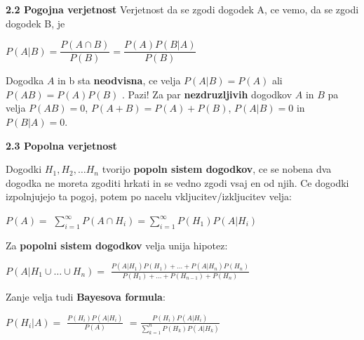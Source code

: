 \documentclass{article}
\begin{document}
\begin{multicols}{2}
	\textbf{2.2 Pogojna verjetnost}
	Verjetnost da se zgodi dogodek A, ce vemo, da se zgodi dogodek B, je
	\begin{center}
		\begin{math}
			P(A | B) = \dfrac{P(A \cap B)}{P(B)} = \dfrac{P(A)P(B|A)}{P(B)}
		\end{math}
	\end{center}
	Dogodka $A$ in b sta \textbf{neodvisna}, ce velja $P(A | B) = P(A)$ ali
	$P(A B) = P(A)P(B)$ .
	Pazi! Za par \textbf{nezdruzljivih} dogodkov $A$ in $B$
	pa velja $P(AB) = 0$,  $P(A + B) = P(A) + P(B)$, $P(A|B) = 0$ in $P(B|A) = 0$.

	\textbf{2.3 Popolna verjetnost}

	Dogodki $H_{1}, H_{2}, \dots H_{n}$ tvorijo \textbf{popoln sistem dogodkov},
	ce se nobena dva dogodka ne moreta zgoditi hrkati in se vedno
	zgodi vsaj en od njih. Ce dogodki izpolnjujejo ta pogoj, potem po
	nacelu vkljucitev/izkljucitev velja:
	\begin{center}
		\begin{math}
			P(A) =
		\end{math}
		\smallskip
		\begin{math}
			\sum_{i=1}^{\infty} P(A \cap H_{i}) =
			\sum_{i=1}^{\infty} P(H_{1}) P(A | H_{i})
		\end{math}
	\end{center}
	Za \textbf{popolni sistem dogodkov} velja unija hipotez:
	\begin{center}
		\begin{math}
			P(A|H_{1} \cup \dots \cup H_{n}) =
		\end{math}
		\bigskip
		\begin{math}
			\frac{
				P(A | H_{1}) P(H_{1}) + \dots +
				P(A | H_{n}) P(H_{n})
			}
			{
				P(H_{1}) + \dots + P(H_{n - 1}) + P(H_{n})
			}
		\end{math}
	\end{center}
	Zanje velja tudi \textbf{Bayesova formula}:
	\begin{center}
		\begin{math}
			P(H_{i} | A) =
		\end{math}
		\begin{math}
			\frac{
				P(H_{i}) P(A | H_{i})
			}
			{
				P(A)
			}
		\end{math}
		\begin{math}
			= \frac{
				P(H_{i}) P(A | H_{i})
			}
			{
				\sum_{k=1}^{n} P(H_{k}) P(A | H_{k})
			}
		\end{math}
	\end{center}


\end{multicols}
\end{document}
